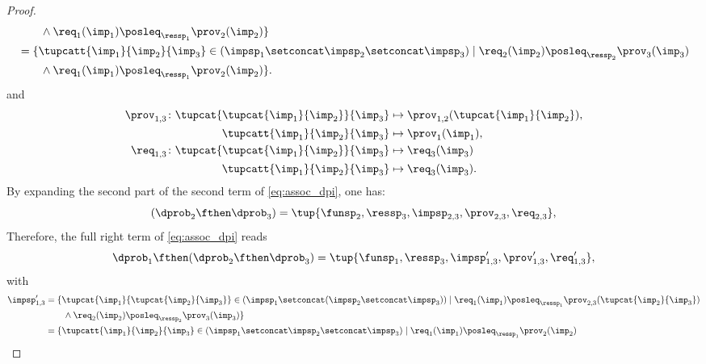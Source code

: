 \begin{proof}
\begin{equation}
\begin{aligned}
            &\qquad \wedge \req_{1}(\imp_{1})\posleq_{\ressp_1}\prov_2(\imp_2)\}\\
            &=\{  \tupcatt{\imp_{1}}{\imp_{2}}{\imp_{3}} \in (\impsp_{1} \setconcat \impsp_{2}\setconcat \impsp_{3})\mid\req_{2}(\imp_2)\posleq_{\ressp_{2}}\prov_{3}(\imp_{3})\\
            &\qquad \wedge \req_{1}(\imp_{1})\posleq_{\ressp_1}\prov_2(\imp_2)\}.
        \end{aligned}
    \end{equation}
    and
    \begin{equation}
        \begin{aligned}
            \prov_{1,3} \colon \tupcat {\tupcat {\imp_{1}} {\imp_{2}}} {\imp_{3}}   &\mapsto\prov_{1,2}(\tupcat {\imp_{1}} {\imp_{2}}),\\
            \tupcatt{\imp_{1}}{\imp_{2}}{\imp_{3}}&\mapsto \prov_1(\imp_{1}),\\
            \req_{1,3} \colon \tupcat {\tupcat {\imp_{1}} {\imp_{2}}} {\imp_{3}} &\mapsto\req_{3}(\imp_{3})\\
            \tupcatt{\imp_{1}}{\imp_{2}}{\imp_{3}}&\mapsto\req_{3}(\imp_{3}).
        \end{aligned}
    \end{equation}
    By expanding the second part of the second term of \cref{eq:assoc_dpi}, one has:
    \begin{equation}
    (\dprob_{2} \fthen \dprob_{3})
        =
        \tup{ \funsp_{2},\ressp_{3},\impsp_{2,3},\prov_{2,3},\req_{2,3}},
    \end{equation}
    Therefore, the full right term of \cref{eq:assoc_dpi} reads
    \begin{equation}
        \label{eq:dpi_ass_2}
        \dprob_{1} \fthen (\dprob_{2}\fthen \dprob_{3})=\tup{ \funsp_{1},\ressp_{3},\impsp'_{1,3},\prov'_{1,3},\req'_{1,3}},
    \end{equation}
    with
    \begin{equation}
        \begin{aligned}
            \impsp_{1,3}'  &=  \{  \tupcat {\imp_{1}} {\tupcat {\imp_{2}} {\imp_{3}}} \in (\impsp_{1} \setconcat (\impsp_{2}\setconcat \impsp_{3}))\mid\req_{1}(\imp_{1})\posleq_{\ressp_{1}}\prov_{2,3}(\tupcat {\imp_{2}} {\imp_{3}})\\
            &\qquad \wedge \req_2(\imp_2)\posleq_{\ressp_2}\prov_3(\imp_3)\}\\
            &=\{  \tupcatt{\imp_{1}}{\imp_{2}}{\imp_{3}} \in (\impsp_{1} \setconcat \impsp_{2}\setconcat \impsp_{3})\mid\req_{1}(\imp_{1})\posleq_{\ressp_{1}}\prov_{2}(\imp_2)\\

\end{aligned}
\end{equation}
\end{proof}
